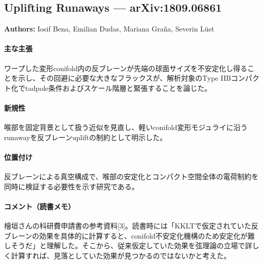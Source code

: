 \subsection{Uplifting Runaways --- arXiv:1809.06861}

\textbf{Authors:} Iosif Bena, Emilian Dudas, Mariana Gra\~na, Severin L\"ust

\paragraph{主な主張}
ワープした変形conifold内の反ブレーンが先端の球面サイズを不安定化し得ることを示し、その回避に必要な大きなフラックスが、解析対象のType IIBコンパクト化でtadpole条件およびスケール階層と緊張することを論じた。 \cite{Bena:2018fqc}

\paragraph{新規性}
喉部を固定背景として扱う近似を見直し、軽いconifold変形モジュライに沿うrunawayを反ブレーンupliftの制約として明示した。

\paragraph{位置付け}
反ブレーンによる真空構成で、喉部の安定化とコンパクト空間全体の電荷制約を同時に検証する必要性を示す研究である。

\paragraph{コメント（読書メモ）}
檜垣さんの科研費申請書の参考資料[3]。読書時には「KKLTで仮定されていた反ブレーンの効果を具体的に計算すると、conifold不安定化機構のため安定化が難しそうだ」と理解した。そこから、従来仮定していた効果を弦理論の立場で詳しく計算すれば、見落としていた効果が見つかるのではないかと考えた。
